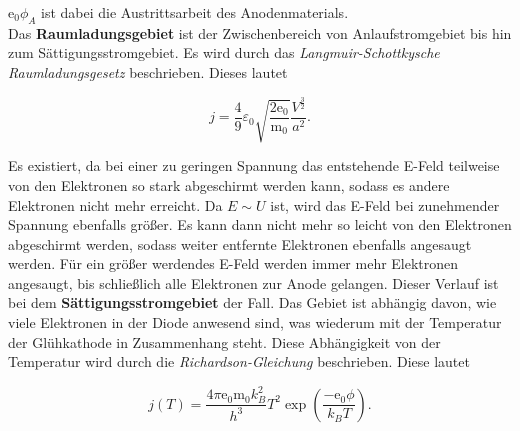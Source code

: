 \noindent $\text{e}_0 \phi_A$ ist dabei die Austrittsarbeit des Anodenmaterials. \\

\noindent Das \textbf{Raumladungsgebiet} ist der Zwischenbereich von Anlaufstromgebiet bis hin zum Sättigungsstromgebiet. 
Es wird durch das \emph{Langmuir-Schottkysche Raumladungsgesetz} beschrieben. Dieses lautet 

\begin{equation}
    j = \frac 4 9 \varepsilon_0 \sqrt{\frac{2\text{e}_0} {\text{m}_0} } \frac{V^{\frac 3 2}}{a^2}.
\end{equation}

\noindent Es existiert, da bei einer zu geringen Spannung das entstehende E-Feld teilweise von den Elektronen so 
stark abgeschirmt werden kann, sodass es andere Elektronen nicht mehr erreicht. Da $E \sim U$ ist, wird das 
E-Feld bei zunehmender Spannung ebenfalls größer. Es kann dann nicht mehr so leicht von den Elektronen abgeschirmt 
werden, sodass weiter entfernte Elektronen ebenfalls angesaugt werden. Für ein größer werdendes E-Feld werden immer 
mehr Elektronen angesaugt, bis schließlich alle Elektronen zur Anode gelangen. Dieser Verlauf ist bei dem 
\textbf{Sättigungsstromgebiet} der Fall. Das Gebiet ist abhängig davon, wie viele Elektronen in der Diode anwesend sind, was 
wiederum mit der Temperatur der Glühkathode in Zusammenhang steht. Diese Abhängigkeit von der Temperatur wird durch 
die \emph{Richardson-Gleichung} beschrieben. Diese lautet

\begin{equation}
    j(T) = \frac{4 \pi \text{e}_0 \text{m}_0 k_B ^2 }{ h^3} T^2 \exp\left(\frac{- \text{e}_0 \phi}{k_B T}\right).
\label{eqn:Richardson}
\end{equation}




